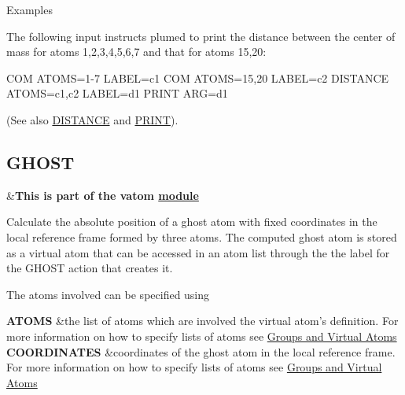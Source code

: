 \begin{DoxyParagraph}{Examples}

\end{DoxyParagraph}
The following input instructs plumed to print the distance between the center of mass for atoms 1,2,3,4,5,6,7 and that for atoms 15,20\+: \begin{DoxyVerb}COM ATOMS=1-7         LABEL=c1
COM ATOMS=15,20       LABEL=c2
DISTANCE ATOMS=c1,c2  LABEL=d1
PRINT ARG=d1
\end{DoxyVerb}
 (See also \hyperlink{DISTANCE}{D\+I\+S\+T\+A\+N\+C\+E} and \hyperlink{PRINT}{P\+R\+I\+N\+T}). \hypertarget{GHOST}{}\subsection{G\+H\+O\+S\+T}\label{GHOST}
\begin{TabularC}{2}
\hline
&{\bfseries  This is part of the vatom \hyperlink{mymodules}{module }}   \\
\end{TabularC}
Calculate the absolute position of a ghost atom with fixed coordinates in the local reference frame formed by three atoms. The computed ghost atom is stored as a virtual atom that can be accessed in an atom list through the the label for the G\+H\+O\+S\+T action that creates it.

\begin{DoxyParagraph}{The atoms involved can be specified using}

\end{DoxyParagraph}
\begin{TabularC}{2}
\hline
{\bfseries  A\+T\+O\+M\+S } &the list of atoms which are involved the virtual atom's definition. For more information on how to specify lists of atoms see \hyperlink{Group}{Groups and Virtual Atoms}   \\
{\bfseries  C\+O\+O\+R\+D\+I\+N\+A\+T\+E\+S } &coordinates of the ghost atom in the local reference frame. For more information on how to specify lists of atoms see \hyperlink{Group}{Groups and Virtual Atoms}   \\
\end{TabularC}


